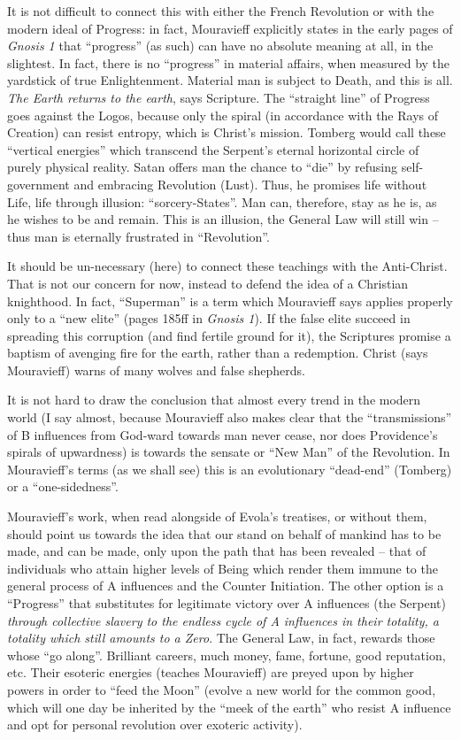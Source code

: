 It is not difficult to connect this with either the French Revolution or with the modern ideal of Progress: in fact, Mouravieff explicitly states in the early pages of \emph{Gnosis 1} that ``progress'' (as such) can have no absolute meaning at all, in the slightest. In fact, there is no ``progress'' in material affairs, when measured by the yardstick of true Enlightenment. Material man is subject to Death, and this is all. \emph{The Earth returns to the earth}, says Scripture. The ``straight line'' of Progress goes against the Logos, because only the spiral (in accordance with the Rays of Creation) can resist entropy, which is Christ's mission. Tomberg would call these ``vertical energies'' which transcend the Serpent's eternal horizontal circle of purely physical reality. Satan offers man the chance to ``die'' by refusing self-government and embracing Revolution (Lust). Thus, he promises life without Life, life through illusion: ``sorcery-States''. Man can, therefore, stay as he is, as he wishes to be and remain. This is an illusion, the General Law will still win -- thus man is eternally frustrated in ``Revolution''.

It should be un-necessary (here) to connect these teachings with the Anti-Christ. That is not our concern for now, instead to defend the idea of a Christian knighthood. In fact, ``Superman'' is a term which Mouravieff says applies properly only to a ``new elite'' (pages 185ff in \emph{Gnosis 1}). If the false elite succeed in spreading this corruption (and find fertile ground for it), the Scriptures promise a baptism of avenging fire for the earth, rather than a redemption. Christ (says Mouravieff) warns of many wolves and false shepherds.

It is not hard to draw the conclusion that almost every trend in the modern world (I say almost, because Mouravieff also makes clear that the ``transmissions'' of B influences from God-ward towards man never cease, nor does Providence's spirals of upwardness) is towards the sensate or ``New Man'' of the Revolution. In Mouravieff's terms (as we shall see) this is an evolutionary ``dead-end'' (Tomberg) or a ``one-sidedness''.

Mouravieff's work, when read alongside of Evola's treatises, or without them, should point us towards the idea that our stand on behalf of mankind has to be made, and can be made, only upon the path that has been revealed -- that of individuals who attain higher levels of Being which render them immune to the general process of A influences and the Counter Initiation. The other option is a ``Progress'' that substitutes for legitimate victory over A influences (the Serpent) \emph{through collective slavery to the endless cycle of A influences in their totality, a totality which still amounts to a Zero}. The General Law, in fact, rewards those whose ``go along''. Brilliant careers, much money, fame, fortune, good reputation, etc. Their esoteric energies (teaches Mouravieff) are preyed upon by higher powers in order to ``feed the Moon'' (evolve a new world for the common good, which will one day be inherited by the ``meek of the earth'' who resist A influence and opt for personal revolution over exoteric activity).

